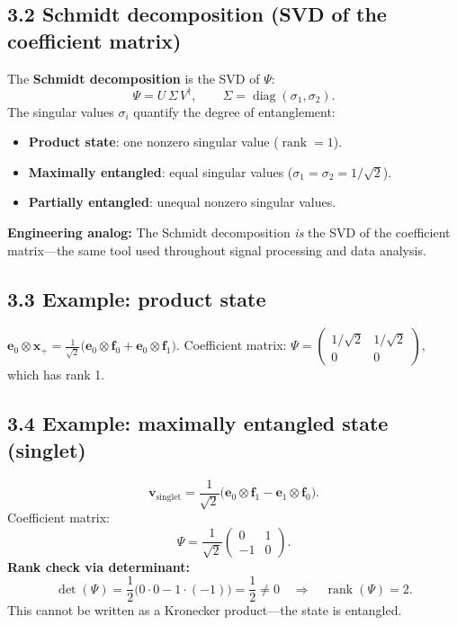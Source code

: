 \documentclass[12pt,a4paper]{article}
\begin{document}
\subsection{3.2 Schmidt decomposition (SVD of the coefficient matrix)}
The \textbf{Schmidt decomposition} is the SVD of $\Psi$:
\[
    \Psi = U\,\Sigma\,V^\dagger, \qquad \Sigma = \operatorname{diag}(\sigma_1, \sigma_2).
\]
The singular values $\sigma_i$ quantify the degree of entanglement:
\begin{itemize}[nosep]
    \item \textbf{Product state}: one nonzero singular value ($\operatorname{rank} = 1$).
    \item \textbf{Maximally entangled}: equal singular values ($\sigma_1 = \sigma_2 = 1/\sqrt{2}$).
    \item \textbf{Partially entangled}: unequal nonzero singular values.
\end{itemize}

\medskip
\noindent\textbf{Engineering analog:} The Schmidt decomposition \emph{is} the SVD of the coefficient matrix---the same tool used throughout signal processing and data analysis.

\subsection{3.3 Example: product state}
$\mathbf{e}_0 \otimes \mathbf{x}_+ = \frac{1}{\sqrt{2}}\bigl(\mathbf{e}_0\otimes\mathbf{f}_0+\mathbf{e}_0\otimes\mathbf{f}_1\bigr)$.  Coefficient matrix:
$\Psi = \begin{pmatrix}1/\sqrt{2} & 1/\sqrt{2} \\ 0 & 0\end{pmatrix}$, which has rank 1.

\subsection{3.4 Example: maximally entangled state (singlet)}
\[
    \mathbf{v}_{\text{singlet}} = \frac{1}{\sqrt{2}}\bigl(\mathbf{e}_0\otimes\mathbf{f}_1 - \mathbf{e}_1\otimes\mathbf{f}_0\bigr).
\]
Coefficient matrix:
\[
    \Psi = \frac{1}{\sqrt{2}}\begin{pmatrix}0 & 1 \\ -1 & 0\end{pmatrix}.
\]
\textbf{Rank check via determinant:}
\[
    \det(\Psi) = \frac{1}{2}\bigl(0\cdot 0 - 1\cdot(-1)\bigr) = \frac{1}{2} \neq 0
    \quad\Longrightarrow\quad \operatorname{rank}(\Psi)=2.
\]
This cannot be written as a Kronecker product---the state is entangled.
\end{document}
